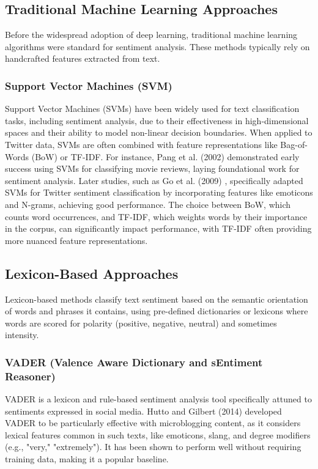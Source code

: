 \subsection{Traditional Machine Learning Approaches}

Before the widespread adoption of deep learning, traditional machine learning algorithms were standard for sentiment analysis. These methods typically rely on handcrafted features extracted from text.


\subsubsection{Support Vector Machines (SVM)}

Support Vector Machines (SVMs) have been widely used for text classification tasks, including sentiment analysis, due to their effectiveness in high-dimensional spaces and their ability to model non-linear decision boundaries. When applied to Twitter data, SVMs are often combined with feature representations like Bag-of-Words (BoW) or TF-IDF. For instance, Pang et al. (2002) \cite{pang2002thumbs}  demonstrated early success using SVMs for classifying movie reviews, laying foundational work for sentiment analysis. Later studies, such as Go et al. (2009) \cite{go2009twitter}, specifically adapted SVMs for Twitter sentiment classification by incorporating features like emoticons and N-grams, achieving good performance. The choice between BoW, which counts word occurrences, and TF-IDF, which weights words by their importance in the corpus, can significantly impact performance, with TF-IDF often providing more nuanced feature representations.


\subsection{Lexicon-Based Approaches}

Lexicon-based methods classify text sentiment based on the semantic orientation of words and phrases it contains, using pre-defined dictionaries or lexicons where words are scored for polarity (positive, negative, neutral) and sometimes intensity.


\subsubsection{VADER (Valence Aware Dictionary and sEntiment Reasoner)
}

VADER is a lexicon and rule-based sentiment analysis tool specifically attuned to sentiments expressed in social media. Hutto and Gilbert (2014) \cite{hutto2014vader} developed VADER to be particularly effective with microblogging content, as it considers lexical features common in such texts, like emoticons, slang, and degree modifiers (e.g., "very," "extremely"). It has been shown to perform well without requiring training data, making it a popular baseline.

